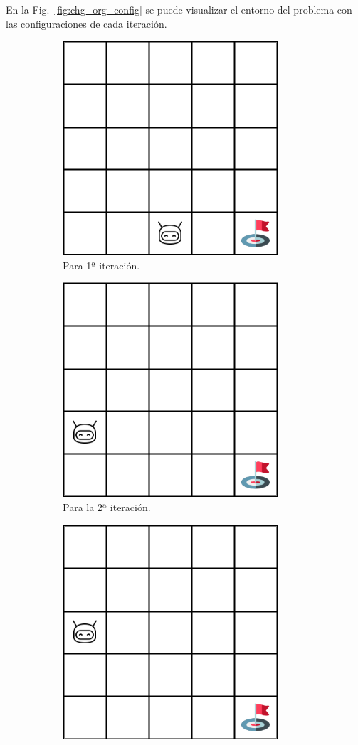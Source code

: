 En la Fig.~\ref{fig:chg_org_config} se puede visualizar el entorno del problema con las configuraciones de cada iteración. \\

\begin{figure}
    \centering
    \begin{subfigure}{.35\textwidth}
        \centering
        \includegraphics[scale=0.35]{cap5_experimentacion/images/chg_org_it1.png}
        \caption{Para 1ª iteración.}
        \label{fig:chg_org_it1}
    \end{subfigure}%
    \begin{subfigure}{.35\textwidth}
        \centering
        \includegraphics[scale=0.35]{cap5_experimentacion/images/chg_org_it2.png}
        \caption{Para la 2ª iteración.}
        \label{fig:chg_org_it2}
    \end{subfigure}%
    \begin{subfigure}{.35\textwidth}
        \centering
        \includegraphics[scale=0.35]{cap5_experimentacion/images/chg_org_it3.png}

\end{subfigure}
\end{figure}
